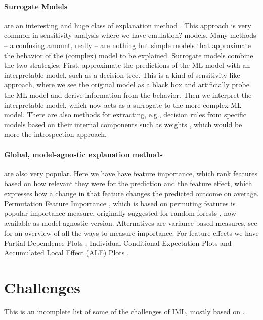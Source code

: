 \documentclass[runningheads]{llncs}
\begin{document}
\paragraph{Surrogate Models} are an interesting and huge class of explanation method \cite{puri2017magix,molnar2019,ming2018rulematrix}.
This approach is very common in sensitivity analysis where we have emulation? models.
Many methods -- a confusing amount, really -- are nothing but simple models that approximate the behavior of the (complex) model to be explained.
Surrogate models combine the two strategies:
First, approximate the predictions of the ML model with an interpretable model, such as a decision tree.
This is a kind of sensitivity-like approach, where we see the original model as a black box and artificially probe the ML model and derive information from the behavior.
Then we interpret the interpretable model, which now acts as a surrogate to the more complex ML model.
There are also methods for extracting, e.g., decision rules from specific models based on their internal components such as weights \cite{andrews1995survey,augasta2012rule}, which would be more the introspection approach.

\paragraph{Global, model-agnostic explanation methods} are also very popular.
Here we have have feature importance, which rank features based on how relevant they were for the prediction and the feature effect, which expresses how a change in that feature changes the predicted outcome on average.
Permutation Feature Importance \cite{fisher2019all}, which is based on permuting features is popular importance measure, originally suggested for random forests \cite{breiman2001random}, now available as model-agnostic version.
Alternatives are variance based measures, see \cite{wei2015variable} for an overview of all the ways to measure importance.
For feature effects we have Partial Dependence Plots \cite{friedman2001greedy}, Individual Conditional Expectation Plots \cite{goldstein2015peeking} and Accumulated Local Effect  (ALE)  Plots \cite{apley2016visualizing}.


\section{Challenges}

This is an incomplete list of some of the challenges of IML, mostly based on \cite{molnar2020pitfalls}.
\end{document}
